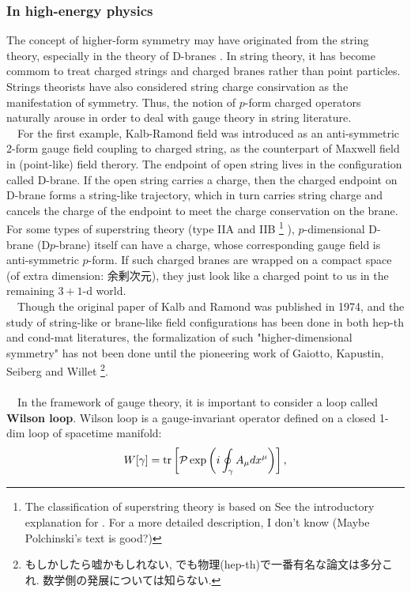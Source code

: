 \documentclass{ltjsarticle}
\theoremstyle{mystyle} %
\numberwithin{equation}{section}
\begin{document}
\subsubsection{In high-energy physics}
The concept of higher-form symmetry may have originated from the string theory, especially in the theory of D-branes
\cite{DGAKNSBW}. 
In string theory, it has become commom to treat charged strings and charged branes rather than point particles. 
Strings theorists have also considered string charge consirvation as the manifestation of symmetry. 
Thus, the notion of $p$-form charged operators naturally arouse in order to deal with gauge theory in string literature. \\
　For the first example, Kalb-Ramond field was introduced as an anti-symmetric 2-form gauge field coupling to charged string, 
as the counterpart of Maxwell field in (point-like) field therory. 
The endpoint of open string lives in the configuration called D-brane. 
If the open string carries a charge, then the charged endpoint on D-brane forms a string-like trajectory, 
which in turn carries string charge and cancels the charge of the endpoint to meet the charge conservation on the brane. 
For some types of superstring theory (type IIA and IIB
\footnote{The classification of superstring theory is based on 
See the introductory explanation for \cite{BZ}. 
For a more detailed description, I don't know (Maybe Polchinski's text is good?)}
), $p$-dimensional D-brane (D$p$-brane) itself can have a charge, whose corresponding gauge field is anti-symmetric $p$-form. 
If such charged branes are wrapped on a compact space (of extra dimension: 余剰次元), 
they just look like a charged point to us in the remaining $3+1$-d world. \\
　Though the original paper of Kalb and Ramond was published in 1974, and the study of 
string-like or brane-like field configurations has been done in both hep-th and cond-mat literatures, 
the formalization of such "higher-dimensional symmetry" has not been done until the pioneering work of 
Gaiotto, Kapustin, Seiberg and Willet \cite{DGAKNSBW} 
\footnote{もしかしたら嘘かもしれない, でも物理(hep-th)で一番有名な論文は多分これ. 数学側の発展については知らない. }. \\
\\
　In the framework of gauge theory, it is important to consider a loop called \textbf{Wilson loop}. 
Wilson loop is a gauge-invariant operator defined on a closed 1-dim loop of spacetime manifold: 
\begin{align}
    W[\gamma]=\tr\left[{\mathcal{P}\exp\left({i\oint_{\gamma}A_\mu dx^\mu}\right)}\right], 
    \label{WL}
\end{align}
\end{document}

